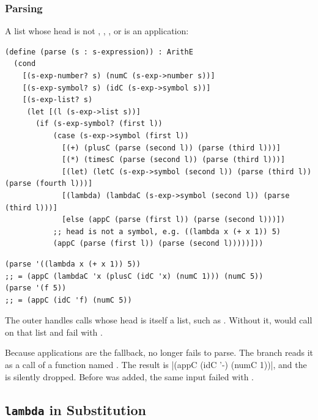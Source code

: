 \subsubsection{Parsing} A list whose head is not \code{+}, \code{*}, , or  is an application:
\begin{lstlisting}
(define (parse (s : s-expression)) : ArithE
  (cond
    [(s-exp-number? s) (numC (s-exp->number s))]
    [(s-exp-symbol? s) (idC (s-exp->symbol s))]
    [(s-exp-list? s)
     (let [(l (s-exp->list s))]
       (if (s-exp-symbol? (first l))
           (case (s-exp->symbol (first l))
             [(+) (plusC (parse (second l)) (parse (third l)))]
             [(*) (timesC (parse (second l)) (parse (third l)))]
             [(let) (letC (s-exp->symbol (second l)) (parse (third l)) (parse (fourth l)))]
             [(lambda) (lambdaC (s-exp->symbol (second l)) (parse (third l)))]
             [else (appC (parse (first l)) (parse (second l)))])
           ;; head is not a symbol, e.g. ((lambda x (+ x 1)) 5)
           (appC (parse (first l)) (parse (second l)))))]))
\end{lstlisting}
\begin{lstlisting}
(parse '((lambda x (+ x 1)) 5))
;; = (appC (lambdaC 'x (plusC (idC 'x) (numC 1))) (numC 5))
(parse '(f 5))
;; = (appC (idC 'f) (numC 5))
\end{lstlisting}
The outer  handles calls whose head is itself a list, such as . Without it,  would call  on that list and fail with .

\begin{remark}
Because applications are the fallback,  no longer fails to parse. The  branch reads it as a call of a function named \code{-}. The result is \rkt|(appC (idC '-) (numC 1))|, and the  is silently dropped. Before  was added, the same input failed with .
\end{remark}

\subsection{\texttt{lambda} in Substitution}

